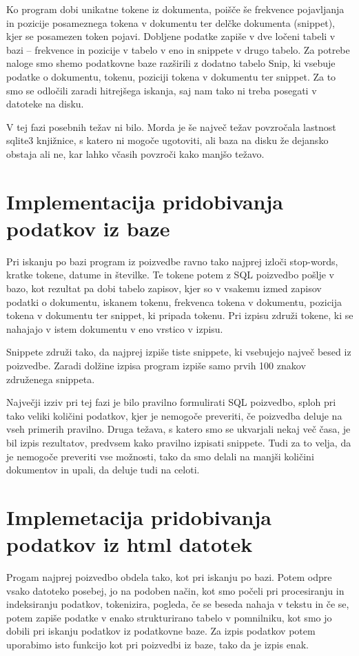 \documentclass[conference]{IEEEtran}
\begin{document}
	Ko program dobi unikatne tokene iz dokumenta, poišče še frekvence pojavljanja in pozicije posameznega tokena v dokumentu ter delčke dokumenta (snippet), kjer se posamezen token pojavi. Dobljene podatke zapiše v dve ločeni tabeli v bazi – frekvence in pozicije v tabelo v eno in snippete v drugo tabelo. Za potrebe naloge smo shemo podatkovne baze razširili z dodatno tabelo Snip, ki vsebuje podatke o dokumentu, tokenu, poziciji tokena v dokumentu ter snippet. Za to smo se odločili zaradi hitrejšega iskanja, saj nam tako ni treba posegati v datoteke na disku.

	V tej fazi posebnih težav ni bilo. Morda je še največ težav povzročala lastnost sqlite3 knjižnice, s katero ni mogoče ugotoviti, ali baza na disku že dejansko obstaja ali ne, kar lahko včasih povzroči kako manjšo težavo. 


	\section{Implementacija pridobivanja podatkov iz baze}

	Pri iskanju po bazi program iz poizvedbe ravno tako najprej izloči stop-words, kratke tokene, datume in številke. Te tokene potem z SQL poizvedbo pošlje v bazo, kot rezultat pa dobi tabelo zapisov, kjer so v vsakemu izmed zapisov podatki o dokumentu, iskanem tokenu, frekvenca tokena v dokumentu, pozicija tokena v dokumentu ter snippet, ki pripada tokenu. Pri izpisu združi tokene, ki se nahajajo v istem dokumentu v eno vrstico v izpisu. 
	
	Snippete združi tako, da najprej izpiše tiste snippete, ki vsebujejo največ besed iz poizvedbe. Zaradi dolžine izpisa program izpiše samo prvih 100 znakov združenega snippeta.

	Največji izziv pri tej fazi je bilo pravilno formulirati SQL poizvedbo, sploh pri tako veliki količini podatkov, kjer je nemogoče preveriti, če poizvedba deluje na vseh primerih pravilno. Druga težava, s katero smo se ukvarjali nekaj več časa, je bil izpis rezultatov, predvsem kako pravilno izpisati snippete. Tudi za to velja, da je nemogoče preveriti vse možnosti, tako da smo delali na manjši količini dokumentov in upali, da deluje tudi na celoti.

	
	\section{Implemetacija pridobivanja podatkov iz html datotek}
	
	Progam najprej poizvedbo obdela tako, kot pri iskanju po bazi. Potem odpre vsako datoteko posebej, jo na podoben način, kot smo počeli pri procesiranju in indeksiranju podatkov, tokenizira, pogleda, če se beseda nahaja v tekstu in če se, potem zapiše podatke v enako strukturirano tabelo v pomnilniku, kot smo jo dobili pri iskanju podatkov iz podatkovne baze. Za izpis podatkov potem uporabimo isto funkcijo kot pri poizvedbi iz baze, tako da je izpis enak.
	
\end{document}
